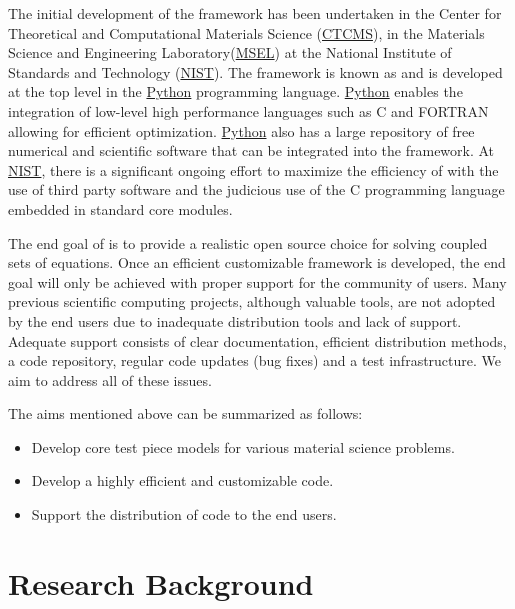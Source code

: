 The initial development of the framework has been undertaken in the
Center for Theoretical and Computational Materials Science
(\href{http://www.ctcms.nist.gov/}{CTCMS}), in the Materials Science
and Engineering Laboratory(\href{http://www.msel.nist.gov/}{MSEL}) at
the National Institute of Standards and Technology
(\href{http://www.nist.gov/}{NIST}). The framework is known as \FiPy{}
and is developed at the top level in the
\href{http://www.python.org/}{Python} programming language.
\href{http://www.python.org/}{Python} enables the integration of
low-level high performance languages such as C and FORTRAN allowing
for efficient optimization. \href{http://www.python.org/}{Python} also
has a large repository of free numerical and scientific software that
can be integrated into the \FiPy{} framework. At
\href{http://www.nist.gov/}{NIST}, there is a significant ongoing effort
to maximize the efficiency of \FiPy{} with the use of third party
software and the judicious use of the C programming language embedded
in standard core modules.

The end goal of \FiPy{} is to provide a realistic open source choice
for solving coupled sets of equations. Once an efficient customizable
framework is developed, the end goal will only be achieved with proper
support for the community of users. Many previous scientific computing
projects, although valuable tools, are not adopted by the end users
due to inadequate distribution tools and lack of support. Adequate
support consists of clear documentation, efficient distribution
methods, a code repository, regular code updates (bug fixes) and a
test infrastructure. We aim to address all of these issues.

The aims mentioned above can be summarized as
follows:
\begin{itemize}
\item Develop core test piece models for various material science problems.
\item Develop a highly efficient and customizable code.
\item Support the distribution of code to the end users.
\end{itemize}

\section{Research Background}

